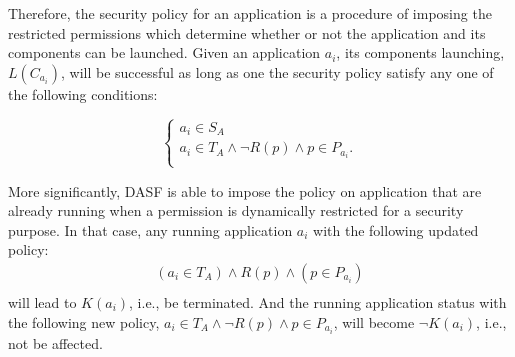 Therefore, the security policy for an application is a procedure of imposing
the restricted permissions which determine whether or not the application and
its components can be launched. Given an application $a_i$, its components
launching, $L(C_{a_i})$, will be successful as long as one the security policy
satisfy any one of the following conditions:

\[\left\{
\begin{array}{l}
a_i \in S_A\\
a_i \in T_{A} \wedge \lnot R\left(p\right) \wedge p \in P_{a_{i}}.\\
\end{array}
\right.
\]






\begin{comment}
$a_{i} \in T_{A} \wedge R\left(p\right) \wedge p \in P_{a_{i}} \wedge a_{i} \neq a_{j} \to \lnot L\left(C_{a_{i}}\right)$
\end{comment}
More significantly, DASF is able to impose the
policy on application that are already running when a permission is
dynamically restricted for a security purpose.  In that case, any
running application $a_i$ with the following updated policy:
\[\left.
\begin{array}{l}
(a_{i} \in T_{A}) \wedge R\left(p\right) \wedge (p \in P_{a_{i}})\\
\end{array}
\right.
\]
will lead to $K(a_i)$, i.e., be terminated.  And the running
application status with the following
new policy, $ a_{i} \in T_{A} \wedge \lnot R\left(p\right) \wedge p \in P_{a_{i}}$,
will become $\lnot K(a_i)$, i.e., not be affected.

